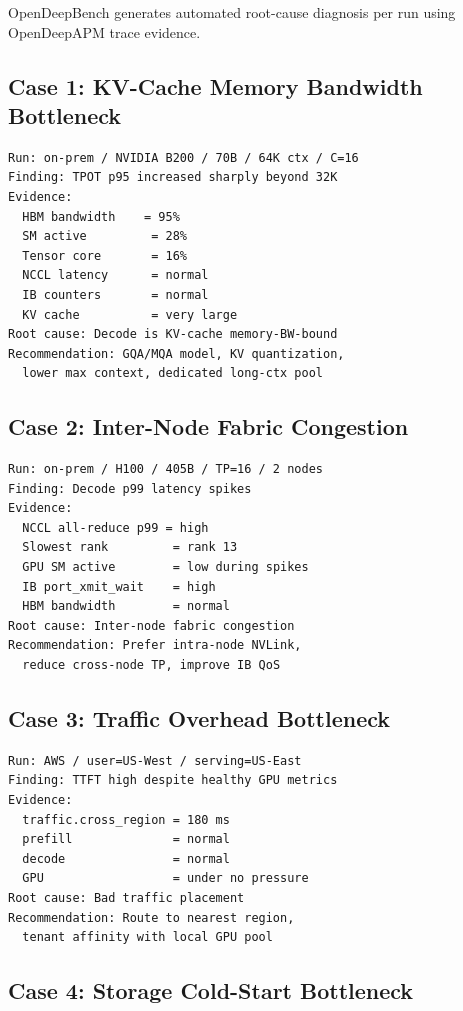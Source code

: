 \documentclass[conference,10pt]{IEEEtran}
\begin{document}
OpenDeepBench generates automated root-cause diagnosis per run using OpenDeepAPM trace evidence.

\subsection{Case 1: KV-Cache Memory Bandwidth Bottleneck}

\begin{lstlisting}
Run: on-prem / NVIDIA B200 / 70B / 64K ctx / C=16
Finding: TPOT p95 increased sharply beyond 32K
Evidence:
  HBM bandwidth    = 95%
  SM active         = 28%
  Tensor core       = 16%
  NCCL latency      = normal
  IB counters       = normal
  KV cache          = very large
Root cause: Decode is KV-cache memory-BW-bound
Recommendation: GQA/MQA model, KV quantization,
  lower max context, dedicated long-ctx pool
\end{lstlisting}

\subsection{Case 2: Inter-Node Fabric Congestion}

\begin{lstlisting}
Run: on-prem / H100 / 405B / TP=16 / 2 nodes
Finding: Decode p99 latency spikes
Evidence:
  NCCL all-reduce p99 = high
  Slowest rank         = rank 13
  GPU SM active        = low during spikes
  IB port_xmit_wait    = high
  HBM bandwidth        = normal
Root cause: Inter-node fabric congestion
Recommendation: Prefer intra-node NVLink,
  reduce cross-node TP, improve IB QoS
\end{lstlisting}

\subsection{Case 3: Traffic Overhead Bottleneck}

\begin{lstlisting}
Run: AWS / user=US-West / serving=US-East
Finding: TTFT high despite healthy GPU metrics
Evidence:
  traffic.cross_region = 180 ms
  prefill              = normal
  decode               = normal
  GPU                  = under no pressure
Root cause: Bad traffic placement
Recommendation: Route to nearest region,
  tenant affinity with local GPU pool
\end{lstlisting}

\subsection{Case 4: Storage Cold-Start Bottleneck}
\end{document}
